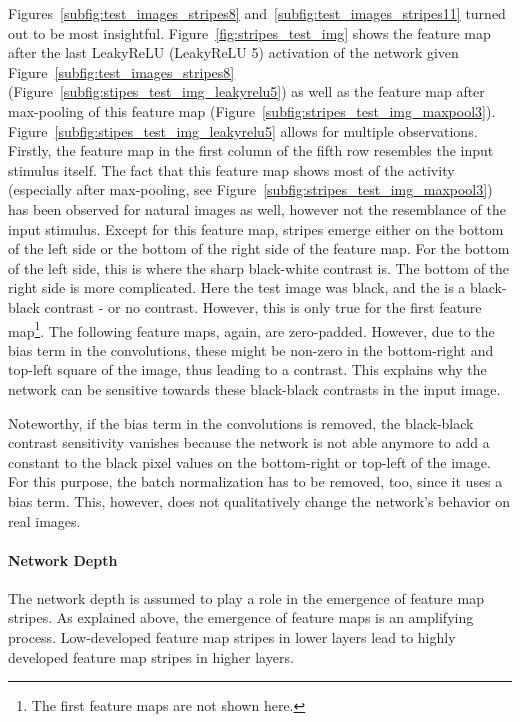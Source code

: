 Figures~\ref{subfig:test_images_stripes8} and~\ref{subfig:test_images_stripes11} turned out to be most insightful.
Figure~\ref{fig:stripes_test_img} shows the feature map after the last LeakyReLU (LeakyReLU 5) activation of the network given Figure~\ref{subfig:test_images_stripes8} (Figure~\ref{subfig:stipes_test_img_leakyrelu5}) as well as the feature map after max-pooling of this feature map (Figure~\ref{subfig:stripes_test_img_maxpool3}).
Figure~\ref{subfig:stipes_test_img_leakyrelu5} allows for multiple observations.
Firstly, the feature map in the first column of the fifth row resembles the input stimulus itself.
The fact that this feature map shows most of the activity (especially after max-pooling, see Figure~\ref{subfig:stripes_test_img_maxpool3}) has been observed for natural images as well, however not the resemblance of the input stimulus.
Except for this feature map, stripes emerge either on the bottom of the left side or the bottom of the right side of the feature map.
For the bottom of the left side, this is where the sharp black-white contrast is.
The bottom of the right side is more complicated.
Here the test image was black, and the  is a black-black contrast - or no contrast.
However, this is only true for the first feature map\footnote{The first feature maps are not shown here.}.
The following feature maps, again, are zero-padded.
However, due to the bias term in the convolutions, these might be non-zero in the bottom-right and top-left square of the image, thus leading to a contrast.
This explains why the network can be sensitive towards these black-black contrasts in the input image.

Noteworthy, if the bias term in the convolutions is removed, the black-black contrast sensitivity vanishes because the network is not able anymore to add a constant to the black pixel values on the bottom-right or top-left of the image.
For this purpose, the batch normalization has to be removed, too, since it uses a bias term.
This, however, does not qualitatively change the network's behavior on real images.

\paragraph{Network Depth}
The network depth is assumed to play a role in the emergence of feature map stripes.
As explained above, the emergence of feature maps is an amplifying process.
Low-developed feature map stripes in lower layers lead to highly developed feature map stripes in higher layers.

